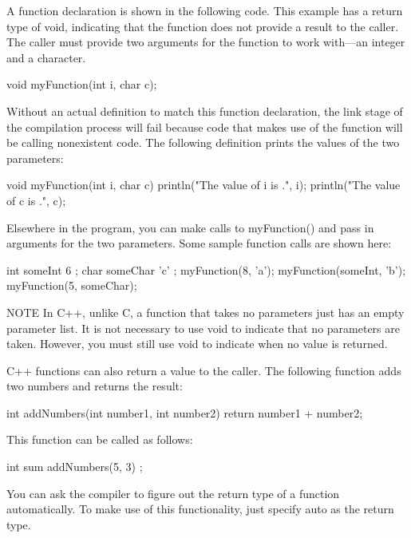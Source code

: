 A function declaration is shown in the following code. This example has a return type of void, indicating that the function does not provide a result to the caller. The caller must provide two arguments for the function to work with—an integer and a character.

\begin{cpp}
void myFunction(int i, char c);
\end{cpp}

Without an actual definition to match this function declaration, the link stage of the compilation process will fail because code that makes use of the function will be calling nonexistent code. The following definition prints the values of the two parameters:

\begin{cpp}
void myFunction(int i, char c)
{
    println("The value of i is {}.", i);
    println("The value of c is {}.", c);
}
\end{cpp}

Elsewhere in the program, you can make calls to myFunction() and pass in arguments for the two parameters. Some sample function calls are shown here:

\begin{cpp}
int someInt { 6 };
char someChar { 'c' };
myFunction(8, 'a');
myFunction(someInt, 'b');
myFunction(5, someChar);
\end{cpp}

\begin{myNotic}{NOTE}
In C++, unlike C, a function that takes no parameters just has an empty parameter list. It is not necessary to use void to indicate that no parameters are taken. However, you must still use void to indicate when no value is returned.
\end{myNotic}

C++ functions can also return a value to the caller. The following function adds two numbers and returns the result:

\begin{cpp}
int addNumbers(int number1, int number2)
{
    return number1 + number2;
}
\end{cpp}

This function can be called as follows:

\begin{cpp}
int sum { addNumbers(5, 3) };
\end{cpp}


You can ask the compiler to figure out the return type of a function automatically. To make use of this functionality, just specify auto as the return type.


